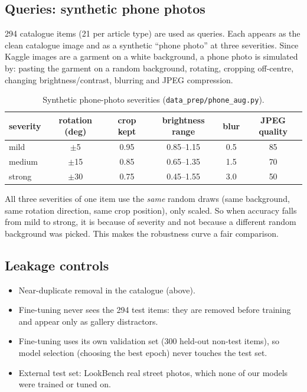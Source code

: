 \documentclass[11pt,a4paper]{article}
\begin{document}
\subsection{Queries: synthetic phone photos}
294 catalogue items (21 per article type) are used as queries. Each appears as the clean catalogue
image and as a synthetic ``phone photo'' at three severities. Since Kaggle images are a garment on a
white background, a phone photo is simulated by: pasting the garment on a random background, rotating,
cropping off-centre, changing brightness/contrast, blurring and JPEG compression.

\begin{table}[H]
\centering
\begin{tabular}{lccccc}
\toprule
severity & rotation (deg) & crop kept & brightness range & blur & JPEG quality \\
\midrule
mild   & $\pm$5  & 0.95 & 0.85--1.15 & 0.5 & 85 \\
medium & $\pm$15 & 0.85 & 0.65--1.35 & 1.5 & 70 \\
strong & $\pm$30 & 0.75 & 0.45--1.55 & 3.0 & 50 \\
\bottomrule
\end{tabular}
\caption{Synthetic phone-photo severities (\texttt{data\_prep/phone\_aug.py}).}
\end{table}

All three severities of one item use the \emph{same} random draws (same background, same rotation
direction, same crop position), only scaled. So when accuracy falls from mild to strong, it is because
of severity and not because a different random background was picked. This makes the robustness curve
a fair comparison.

\subsection{Leakage controls}
\begin{itemize}
  \item Near-duplicate removal in the catalogue (above).
  \item Fine-tuning never sees the 294 test items: they are removed before training and appear only as
        gallery distractors.
  \item Fine-tuning uses its own validation set (300 held-out non-test items), so model selection
        (choosing the best epoch) never touches the test set.
  \item External test set: LookBench real street photos, which none of our models were trained or
        tuned on.
\end{itemize}
\end{document}
